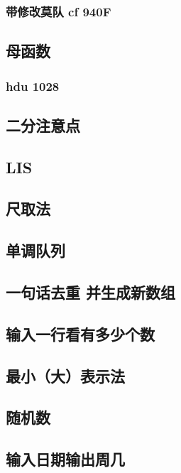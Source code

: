 \documentclass[10pt,a4paper]{article}
\begin{document}
\subsubsection{带修改莫队 cf 940F}

\subsection{母函数}
\subsubsection{hdu 1028}

\subsection{二分注意点}

\subsection{LIS}

\subsection{尺取法}

\subsection{单调队列}

\subsection{一句话去重 并生成新数组}

\subsection{输入一行看有多少个数}

\subsection{最小（大）表示法}

\subsection{随机数}

\subsection{输入日期输出周几}

\end{document}
